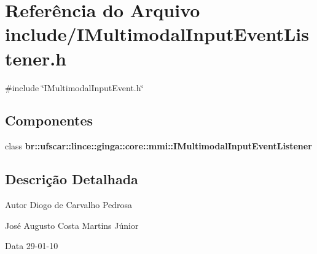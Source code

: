 \section{Referência do Arquivo include/IMultimodalInputEventListener.h}
\label{IMultimodalInputEventListener_8h}
{\ttfamily \#include \char`\"{}IMultimodalInputEvent.h\char`\"{}}\par
\subsection*{Componentes}
\begin{DoxyCompactItemize}
\item 
class {\bf br::ufscar::lince::ginga::core::mmi::IMultimodalInputEventListener}
\end{DoxyCompactItemize}


\subsection{Descrição Detalhada}
\begin{DoxyAuthor}{Autor}
Diogo de Carvalho Pedrosa 

José Augusto Costa Martins Júnior 
\end{DoxyAuthor}
\begin{DoxyDate}{Data}
29-\/01-\/10 
\end{DoxyDate}
